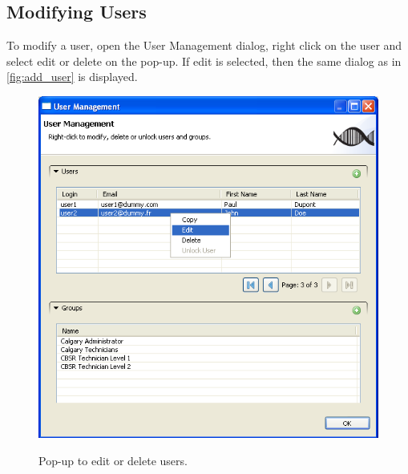 \subsection{Modifying Users}
To modify a user, open the User Management dialog, right click on the user and select 
edit or delete on the pop-up. If edit is selected, then the same dialog as in \ref{fig:add_user} is displayed.
\begin{figure}[H]
  \centering
  \scalebox{0.5}
	   { \includegraphics*{screenshots/administration/edit_delete_user} }
	   \caption{Pop-up to edit or delete users.}
	   \label{fig:edit_delete_users}
\end{figure}


